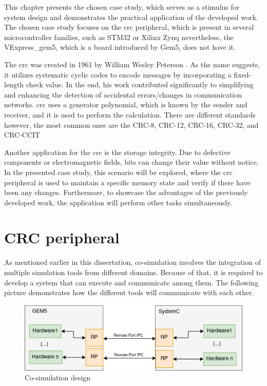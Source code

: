 
This chapter presents the chosen case study, which serves as a stimulus for system design and demonstrates 
the practical application of the developed work. The chosen case study focuses on the \gls{crc} peripheral,
which is present in several microcontroller families, such as STM32 \cite{referenceManualRM0385} or Xilinx Zynq \cite{xilinx2014zynq} 
nevertheless, the VExpress\_gem5, which is a board introduced by Gem5, does not have it.

The \gls{crc} was created in 1961 by William Wesley Peterson \cite{peterson1961cyclic}. As the name suggests, 
it utilizes systematic cyclic codes to encode messages by incorporating a fixed-length check value. In the end, his work
contributed significantly to simplifying and enhancing the detection of accidental errors/changes in communication 
networks. \gls{crc} uses a generator polynomial, which is known by the sender and receiver, and it is used to 
perform the calculation. There are different standards however, the most common ones are the CRC-8, CRC-12, CRC-16, 
CRC-32, and CRC-CCIT \cite{borrelli2001ieee}

Another application for the \gls{crc} is the storage integrity. Due to defective components or electromagnetic fields,
bits can change their value without notice. In the presented case study, this scenario will be explored, where 
the \gls{crc} peripheral is used to maintain a specific memory state and verify if there have been any changes. 
Furthermore, to showcase the advantages of the previously developed work, the application will perform other 
tasks simultaneously. 

\section{CRC peripheral} %

As mentioned earlier in this dissertation, co-simulation involves the integration of multiple simulation tools from different
domains. Because of that, it is required to develop a system that can execute and communicate among them. The following picture
demonstrates how the different tools will communicate with each other.

\begin{figure}[H]
	\centering
 	\includegraphics[width=0.8\linewidth]{Images/CoSimDesignSimplified.png} 
 	\caption{Co-simulation design}
	 \label{fig_CoSimDesignSimplified}
\end{figure}

